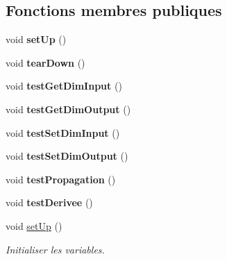 \subsection*{Fonctions membres publiques}
\begin{DoxyCompactItemize}
\item 
\mbox{\label{class_test_couche_aceb4afd1f69e11bb98a0fb69c5468e85}} 
void {\bfseries set\+Up} ()
\item 
\mbox{\label{class_test_couche_a52d776a6624d1ff323b9c390be482809}} 
void {\bfseries tear\+Down} ()
\item 
\mbox{\label{class_test_couche_a91abe7adddd8687482a86316995d6d2b}} 
void {\bfseries test\+Get\+Dim\+Input} ()
\item 
\mbox{\label{class_test_couche_a9f2a6f3c97c55c920acb3d552a5ccc4d}} 
void {\bfseries test\+Get\+Dim\+Output} ()
\item 
\mbox{\label{class_test_couche_aa192e04275717fab674f977fb24cb59e}} 
void {\bfseries test\+Set\+Dim\+Input} ()
\item 
\mbox{\label{class_test_couche_a6762ad4ef2194ba9990f838d0543c851}} 
void {\bfseries test\+Set\+Dim\+Output} ()
\item 
\mbox{\label{class_test_couche_a2012666426b127d26006dca756986575}} 
void {\bfseries test\+Propagation} ()
\item 
\mbox{\label{class_test_couche_aefdfb41451d5a04fcc3e33704b900315}} 
void {\bfseries test\+Derivee} ()
\item 
\mbox{\label{class_test_couche_aceb4afd1f69e11bb98a0fb69c5468e85}} 
void \hyperlink{class_test_couche_aceb4afd1f69e11bb98a0fb69c5468e85}{set\+Up} ()
\begin{DoxyCompactList}\small\item\em Initialiser les variables. \end{DoxyCompactList}\item 
\mbox{\label{class_test_couche_a52d776a6624d1ff323b9c390be482809}} 

\end{DoxyCompactItemize}
